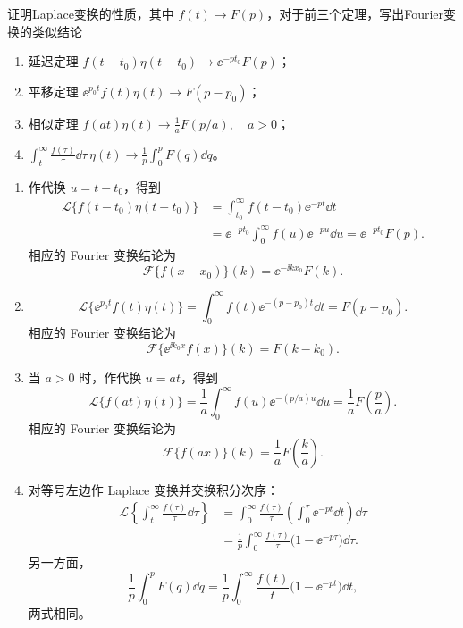 
\begin{question}
证明Laplace变换的性质，其中 \(f(t) \to F(p)\)，对于前三个定理，写出Fourier变换的类似结论
\begin{enumerate}
  \item 延迟定理 \(f(t-t_0) \eta(t-t_0) \to \ee^{-p t_0} F(p)\)；
  \item 平移定理 \(\ee^{p_0 t} f(t) \eta(t) \to F(p-p_0)\)；
  \item 相似定理 \(f(a t) \eta(t) \to \frac1a F(p/a),\quad a>0\)；
  \item \(\displaystyle\int_t^\infty \frac{f(\tau)}{\tau}\dd{}\tau\, \eta(t) \to \frac1p \int_0^p F(q)\dd{q}\)。
\end{enumerate}

\begin{solution}
\begin{enumerate}
  \item 作代换 \(u=t-t_0\)，得到
  \[
  \begin{aligned}
  \mathcal{L}\{f(t-t_0)\eta(t-t_0)\}
  &=\int_{t_0}^{\infty}f(t-t_0)\ee^{-pt}\dd{t}\\
  &=\ee^{-pt_0}\int_0^\infty f(u)\ee^{-pu}\dd{u}
  =\ee^{-pt_0}F(p).
  \end{aligned}
  \]
  相应的 Fourier 变换结论为
  \[
  \mathcal{F}\{f(x-x_0)\}(k)=\ee^{-\ii kx_0}F(k).
  \]

  \item
  \[
  \mathcal{L}\{\ee^{p_0t}f(t)\eta(t)\}
  =\int_0^\infty f(t)\ee^{-(p-p_0)t}\dd{t}
  =F(p-p_0).
  \]
  相应的 Fourier 变换结论为
  \[
  \mathcal{F}\{\ee^{\ii k_0x}f(x)\}(k)=F(k-k_0).
  \]

  \item 当 \(a>0\) 时，作代换 \(u=at\)，得到
  \[
  \mathcal{L}\{f(at)\eta(t)\}
  =\frac1a\int_0^\infty f(u)\ee^{-(p/a)u}\dd{u}
  =\frac1aF\left(\frac pa\right).
  \]
  相应的 Fourier 变换结论为
  \[
  \mathcal{F}\{f(ax)\}(k)=\frac1aF\left(\frac ka\right).
  \]

  \item 对等号左边作 Laplace 变换并交换积分次序：
  \[
  \begin{aligned}
  \mathcal{L}\left\{\int_t^\infty\frac{f(\tau)}{\tau}\dd{\tau}\right\}
  &=\int_0^\infty\frac{f(\tau)}{\tau}
    \left(\int_0^\tau\ee^{-pt}\dd{t}\right)\dd{\tau}\\
  &=\frac1p\int_0^\infty\frac{f(\tau)}{\tau}
    \bigl(1-\ee^{-p\tau}\bigr)\dd{\tau}.
  \end{aligned}
  \]
  另一方面，
  \[
  \frac1p\int_0^pF(q)\dd{q}
  =\frac1p\int_0^\infty\frac{f(t)}{t}
    \bigl(1-\ee^{-pt}\bigr)\dd{t},
  \]
  两式相同。
\end{enumerate}


\end{solution}
\end{question}
